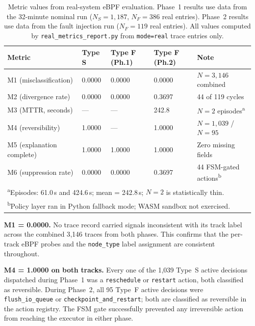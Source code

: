 \documentclass[runningheads]{llncs}
\begin{document}
\begin{table}[t]
\caption{Metric values from real-system eBPF evaluation. Phase~1
results use data from the 32-minute nominal run ($N_S=1{,}187$,
$N_F=386$ real entries). Phase~2 results use data from the fault
injection run ($N_F=119$ real entries). All values computed by
\texttt{real\_metrics\_report.py} from \texttt{mode=real} trace
entries only.}
\label{tab:results}
\centering
\begin{tabular}{lllll}
\toprule
\textbf{Metric} & \textbf{Type S} & \textbf{Type F (Ph.1)} & \textbf{Type F (Ph.2)} & \textbf{Note}\\
\midrule
M1 (misclassification)    & 0.0000 & 0.0000 & 0.0000 & $N=3{,}146$ combined\\
M2 (divergence rate)      & 0.0000 & 0.0000 & 0.3697 & 44 of 119 cycles\\
M3 (MTTR, seconds)        & ---    & ---    & 242.8  & $N=2$ episodes\textsuperscript{a}\\
M4 (reversibility)        & 1.0000 & ---    & 1.0000 & $N=1{,}039$ / $N=95$\\
M5 (explanation complete) & 1.0000 & 1.0000 & 1.0000 & Zero missing fields\\
M6 (suppression rate)     & 0.0000 & 0.0000 & 0.3697 & 44 FSM-gated actions\textsuperscript{b}\\
\bottomrule
\multicolumn{5}{l}{\textsuperscript{a}Episodes: 61.0\,s and 424.6\,s; mean = 242.8\,s; $N=2$ is statistically thin.}\\
\multicolumn{5}{l}{\textsuperscript{b}Policy layer ran in Python fallback mode; WASM sandbox not exercised.}
\end{tabular}
\end{table}

\textbf{M1 = 0.0000.} No trace record carried signals inconsistent
with its track label across the combined 3{,}146 traces from both
phases. This confirms that the per-track eBPF probes and the
\texttt{node\_type} label assignment are consistent throughout.

\textbf{M4 = 1.0000 on both tracks.} Every one of the 1{,}039
Type~S active decisions dispatched during Phase~1 was a
\texttt{reschedule} or \texttt{restart} action, both classified as
reversible. During Phase~2, all 95 Type~F active decisions were
\texttt{flush\_io\_queue} or \texttt{checkpoint\_and\_restart};
both are classified as reversible in the action registry. The FSM gate
successfully prevented any irreversible action from reaching the
executor in either phase.
\end{document}
